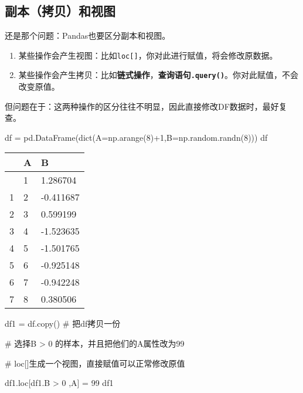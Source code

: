 \documentclass[
  letterpaper,
  DIV=11,
  numbers=noendperiod]{scrreprt}
\newenvironment{Shaded}{\begin{snugshade}}{\end{snugshade}}
\newcommand{\BuiltInTok}[1]{\textcolor[rgb]{0.00,0.23,0.31}{#1}}
\newcommand{\CommentTok}[1]{\textcolor[rgb]{0.37,0.37,0.37}{#1}}
\newcommand{\DecValTok}[1]{\textcolor[rgb]{0.68,0.00,0.00}{#1}}
\newcommand{\NormalTok}[1]{\textcolor[rgb]{0.00,0.23,0.31}{#1}}
\newcommand{\OperatorTok}[1]{\textcolor[rgb]{0.37,0.37,0.37}{#1}}
\newcommand{\StringTok}[1]{\textcolor[rgb]{0.13,0.47,0.30}{#1}}
\providecommand{\tightlist}{%
  \setlength{\itemsep}{0pt}\setlength{\parskip}{0pt}}\usepackage{longtable,booktabs,array}
\begin{document}
\hypertarget{ux526fux672cux62f7ux8d1dux548cux89c6ux56fe}{%
\subsection{副本（拷贝）和视图}\label{ux526fux672cux62f7ux8d1dux548cux89c6ux56fe}}

还是那个问题：Pandas也要区分副本和视图。

\begin{enumerate}
\def\labelenumi{\arabic{enumi}.}
\tightlist
\item
  某些操作会产生视图：比如\texttt{loc{[}{]}}，你对此进行赋值，将会修改原数据。
\item
  某些操作会产生拷贝：比如\textbf{链式操作}，\textbf{查询语句\texttt{.query()}}。你对此赋值，不会改变原值。
\end{enumerate}

但问题在于：这两种操作的区分往往不明显，因此直接修改DF数据时，最好复查。

\begin{Shaded}
\begin{Highlighting}[]
\NormalTok{df }\OperatorTok{=}\NormalTok{ pd.DataFrame(}\BuiltInTok{dict}\NormalTok{(A}\OperatorTok{=}\NormalTok{np.arange(}\DecValTok{8}\NormalTok{)}\OperatorTok{+}\DecValTok{1}\NormalTok{,B}\OperatorTok{=}\NormalTok{np.random.randn(}\DecValTok{8}\NormalTok{)))}
\NormalTok{df}
\end{Highlighting}
\end{Shaded}

\begin{longtable}[]{@{}lll@{}}
\toprule\noalign{}
& A & B \\
\midrule\noalign{}
\endhead
\bottomrule\noalign{}
\endlastfoot
0 & 1 & 1.286704 \\
1 & 2 & -0.411687 \\
2 & 3 & 0.599199 \\
3 & 4 & -1.523635 \\
4 & 5 & -1.501765 \\
5 & 6 & -0.925148 \\
6 & 7 & -0.942248 \\
7 & 8 & 0.380506 \\
\end{longtable}

\begin{Shaded}
\begin{Highlighting}[]
\NormalTok{df1 }\OperatorTok{=}\NormalTok{ df.copy() }\CommentTok{\# 把df拷贝一份}


\CommentTok{\# 选择B \textgreater{} 0 的样本，并且把他们的A属性改为99}

\CommentTok{\# \textasciigrave{}loc[]\textasciigrave{}生成一个视图，直接赋值可以正常修改原值}

\NormalTok{df1.loc[df1.B }\OperatorTok{\textgreater{}} \DecValTok{0}\NormalTok{ ,}\StringTok{\textquotesingle{}A\textquotesingle{}}\NormalTok{] }\OperatorTok{=} \DecValTok{99}
\NormalTok{df1}
\end{Highlighting}
\end{Shaded}
\end{document}
